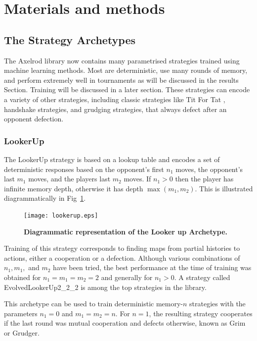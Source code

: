 \documentclass[10pt,letterpaper]{article}
\begin{document}
\section*{Materials and methods}
\subsection*{The Strategy Archetypes}

The Axelrod library now contains many parametrised strategies trained using
machine learning
methods. Most are deterministic, use many rounds of memory, and perform
extremely well in tournaments as will be discussed in the results Section.
Training will be discussed in a later section.
These strategies can encode a variety
of other strategies, including classic strategies like Tit For Tat
\cite{Axelrod1980},
handshake strategies, and grudging strategies, that always defect after
an opponent defection.

\subsubsection*{LookerUp}\label{sec:lookerup}

The LookerUp strategy is based on a lookup table and encodes a set of
deterministic responses based on the opponent's first $n_1$ moves, the
opponent's last $m_1$ moves, and the players last $m_2$ moves. If $n_1 > 0$ then
the player has infinite memory depth, otherwise it has depth $\max(m_1, m_2)$.
This is illustrated diagrammatically in Fig~\ref{fig:lookerup}.

\begin{figure}[!hbtp]
    \centering
    \texttt{[image: lookerup.eps]}
    \caption{\bf Diagrammatic representation of the Looker up Archetype.}
    \label{fig:lookerup}
\end{figure}

Training of this strategy corresponds to finding maps from partial histories to
actions, either a cooperation or a defection. Although various
combinations of $n_1, m_1,$ and $m_2$ have been tried, the best performance at
the time of
training was obtained for $n_1 = m_1 = m_2 = 2$ and generally for $n_1 > 0$.
A strategy
called EvolvedLookerUp2\_2\_2 is among the top strategies in the library.

This archetype can be used to train deterministic memory-$n$ strategies with the
parameters $n_1=0$ and $m_1=m_2=n$. For $n=1$, the resulting strategy cooperates
if the last round was mutual cooperation and defects otherwise, known as Grim or
Grudger.
\end{document}
